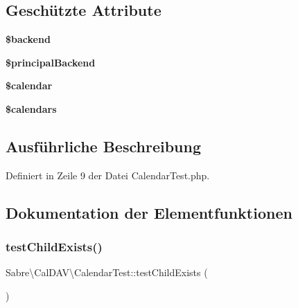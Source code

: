 \subsection*{Geschützte Attribute}
\begin{DoxyCompactItemize}
\item 
\mbox{\label{class_sabre_1_1_cal_d_a_v_1_1_calendar_test_a48ffcb2e9e1567390fa6414582eb4708}} 
{\bfseries \$backend}
\item 
\mbox{\label{class_sabre_1_1_cal_d_a_v_1_1_calendar_test_a875a93160f3318dfc2b3be08ba32abb7}} 
{\bfseries \$principal\+Backend}
\item 
\mbox{\label{class_sabre_1_1_cal_d_a_v_1_1_calendar_test_aff11219dc457eebb1286ee5ee514755a}} 
{\bfseries \$calendar}
\item 
\mbox{\label{class_sabre_1_1_cal_d_a_v_1_1_calendar_test_a95f6c4271d18b9508f08b2748f72381c}} 
{\bfseries \$calendars}
\end{DoxyCompactItemize}


\subsection{Ausführliche Beschreibung}


Definiert in Zeile 9 der Datei Calendar\+Test.\+php.



\subsection{Dokumentation der Elementfunktionen}
\mbox{\label{class_sabre_1_1_cal_d_a_v_1_1_calendar_test_a9d4fd54fc70f2a2fe8b53240de49e7f9}} 
\subsubsection{\texorpdfstring{test\+Child\+Exists()}{testChildExists()}}
{\footnotesize\ttfamily Sabre\textbackslash{}\+Cal\+D\+A\+V\textbackslash{}\+Calendar\+Test\+::test\+Child\+Exists (\begin{DoxyParamCaption}{ }\end{DoxyParamCaption})}

